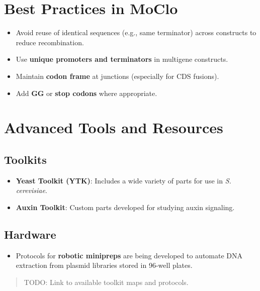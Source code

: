 \documentclass[
  letterpaper,
  DIV=11,
  numbers=noendperiod]{scrreprt}
\providecommand{\tightlist}{%
  \setlength{\itemsep}{0pt}\setlength{\parskip}{0pt}}\usepackage{longtable,booktabs,array}
\begin{document}
\section{Best Practices in MoClo}\label{best-practices-in-moclo}

\begin{itemize}
\tightlist
\item
  Avoid reuse of identical sequences (e.g., same terminator) across
  constructs to reduce recombination.
\item
  Use \textbf{unique promoters and terminators} in multigene constructs.
\item
  Maintain \textbf{codon frame} at junctions (especially for CDS
  fusions).
\item
  Add \textbf{GG} or \textbf{stop codons} where appropriate.
\end{itemize}

\section{Advanced Tools and
Resources}\label{advanced-tools-and-resources}

\subsection{Toolkits}\label{toolkits}

\begin{itemize}
\tightlist
\item
  \textbf{Yeast Toolkit (YTK)}: Includes a wide variety of parts for use
  in \emph{S. cerevisiae}.
\item
  \textbf{Auxin Toolkit}: Custom parts developed for studying auxin
  signaling.
\end{itemize}

\subsection{Hardware}\label{hardware}

\begin{itemize}
\tightlist
\item
  Protocols for \textbf{robotic minipreps} are being developed to
  automate DNA extraction from plasmid libraries stored in 96-well
  plates.
\end{itemize}

\begin{quote}
TODO: Link to available toolkit maps and protocols.
\end{quote}
\end{document}
